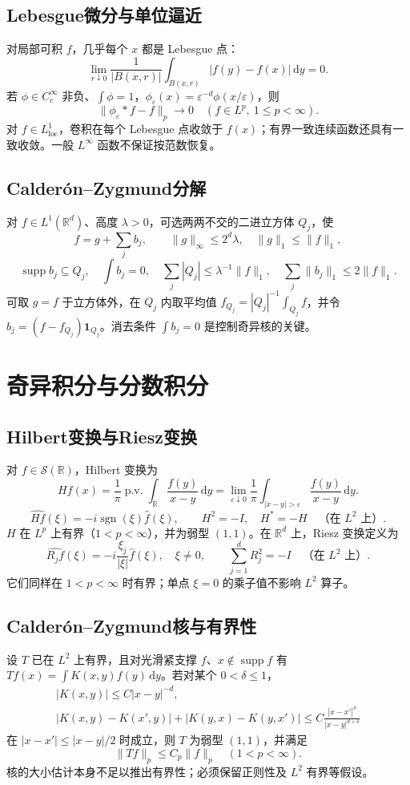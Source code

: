 \documentclass[../main.tex]{subfiles}
\begin{document}
\subsection{Lebesgue微分与单位逼近}
对局部可积 $f$，几乎每个 $x$ 都是 Lebesgue 点：
\[
\lim_{r\downarrow0}\frac1{|B(x,r)|}\int_{B(x,r)}|f(y)-f(x)|\,\mathrm dy=0.
\]
若 $\phi\in C_c^\infty$ 非负、$\int\phi=1$，$\phi_\varepsilon(x)=\varepsilon^{-d}\phi(x/\varepsilon)$，则
\[
\|\phi_\varepsilon*f-f\|_p\to0\quad(f\in L^p,\ 1\le p<\infty).
\]
对 $f\in L^1_{\mathrm{loc}}$，卷积在每个 Lebesgue 点收敛于 $f(x)$；有界一致连续函数还具有一致收敛。一般 $L^\infty$ 函数不保证按范数恢复。
\subsection{Calderón--Zygmund分解}
对 $f\in L^1(\mathbb R^d)$、高度 $\lambda>0$，可选两两不交的二进立方体 $Q_j$，使
\[
f=g+\sum_jb_j,\qquad
\|g\|_\infty\le2^d\lambda,\quad\|g\|_1\le\|f\|_1,
\]
\[
\operatorname{supp}b_j\subseteq Q_j,\quad\int b_j=0,\quad
\sum_j|Q_j|\le\lambda^{-1}\|f\|_1,\quad
\sum_j\|b_j\|_1\le2\|f\|_1.
\]
可取 $g=f$ 于立方体外，在 $Q_j$ 内取平均值 $f_{Q_j}=|Q_j|^{-1}\int_{Q_j}f$，并令 $b_j=(f-f_{Q_j})\bm1_{Q_j}$。消去条件 $\int b_j=0$ 是控制奇异核的关键。
\section{奇异积分与分数积分}
\subsection{Hilbert变换与Riesz变换}
对 $f\in\mathcal S(\mathbb R)$，Hilbert 变换为
\[
Hf(x)=\frac1\pi\operatorname{p.v.}\int_{\mathbb R}\frac{f(y)}{x-y}\,\mathrm dy
=\lim_{\varepsilon\downarrow0}\frac1\pi\int_{|x-y|>\varepsilon}\frac{f(y)}{x-y}\,\mathrm dy.
\]
\[
\widehat{Hf}(\xi)=-i\operatorname{sgn}(\xi)\widehat f(\xi),\qquad
H^2=-I,\quad H^*=-H\quad\text{（在 }L^2\text{ 上）}.
\]
$H$ 在 $L^p$ 上有界（$1<p<\infty$），并为弱型 $(1,1)$。在 $\mathbb R^d$ 上，Riesz 变换定义为
\[
\widehat{R_jf}(\xi)=-i\frac{\xi_j}{|\xi|}\widehat f(\xi),\quad\xi\ne0,
\qquad \sum_{j=1}^dR_j^2=-I\quad\text{（在 }L^2\text{ 上）}.
\]
它们同样在 $1<p<\infty$ 时有界；单点 $\xi=0$ 的乘子值不影响 $L^2$ 算子。
\subsection{Calderón--Zygmund核与有界性}
设 $T$ 已在 $L^2$ 上有界，且对光滑紧支撑 $f$、$x\notin\operatorname{supp}f$ 有 $Tf(x)=\int K(x,y)f(y)\,\mathrm dy$。若对某个 $0<\delta\le1$，
\begin{gather*}
|K(x,y)|\le C|x-y|^{-d},\\
|K(x,y)-K(x',y)|+|K(y,x)-K(y,x')|
\le C\frac{|x-x'|^\delta}{|x-y|^{d+\delta}}
\end{gather*}
在 $|x-x'|\le|x-y|/2$ 时成立，则 $T$ 为弱型 $(1,1)$，并满足
\[
\|Tf\|_p\le C_p\|f\|_p\quad(1<p<\infty).
\]
核的大小估计本身不足以推出有界性；必须保留正则性及 $L^2$ 有界等假设。
\end{document}
